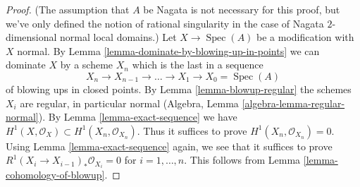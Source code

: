 \documentclass[10pt,a4paper]{amsart}
\theoremstyle{plain}
\theoremstyle{definition}
\theoremstyle{remark}
\numberwithin{equation}{subsection}
\def\Spec{\mathop{\mathrm{Spec}}}
\begin{document}
\begin{proof}
(The assumption that $A$ be Nagata is not necessary for this proof,
but we've only defined the notion of rational singularity in the
case of Nagata $2$-dimensional normal local domains.)
Let $X \to \Spec(A)$ be a modification with $X$ normal. By
Lemma \ref{lemma-dominate-by-blowing-up-in-points}
we can dominate $X$ by a scheme $X_n$ which is the last in a sequence
$$
X_n \to X_{n - 1} \to \ldots \to X_1 \to X_0 = \Spec(A)
$$
of blowing ups in closed points. By Lemma \ref{lemma-blowup-regular}
the schemes $X_i$ are regular, in particular
normal (Algebra, Lemma \ref{algebra-lemma-regular-normal}).
By Lemma \ref{lemma-exact-sequence} we have
$H^1(X, \mathcal{O}_X) \subset H^1(X_n, \mathcal{O}_{X_n})$.
Thus it suffices to prove $H^1(X_n, \mathcal{O}_{X_n}) = 0$.
Using Lemma \ref{lemma-exact-sequence} again, we
see that it suffices to prove $R^1(X_i \to X_{i - 1})_*\mathcal{O}_{X_i} = 0$
for $i = 1, \ldots, n$. This follows from
Lemma \ref{lemma-cohomology-of-blowup}.
\end{proof}
\end{document}
